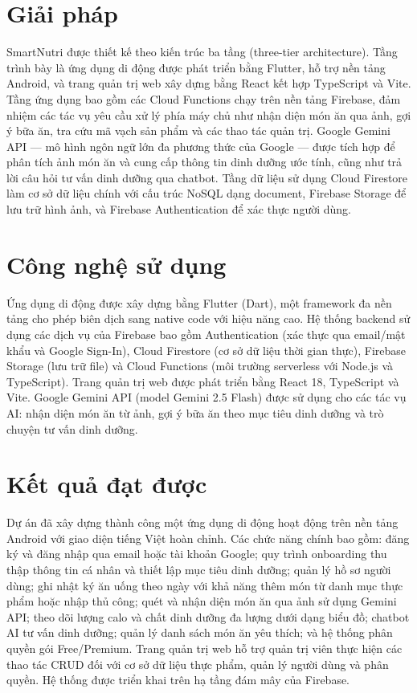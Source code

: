 \section*{Giải pháp}

SmartNutri được thiết kế theo kiến trúc ba tầng (three-tier architecture). Tầng trình bày là ứng dụng di động được phát triển bằng Flutter, hỗ trợ nền tảng Android, và trang quản trị web xây dựng bằng React kết hợp TypeScript và Vite. Tầng ứng dụng bao gồm các Cloud Functions chạy trên nền tảng Firebase, đảm nhiệm các tác vụ yêu cầu xử lý phía máy chủ như nhận diện món ăn qua ảnh, gợi ý bữa ăn, tra cứu mã vạch sản phẩm và các thao tác quản trị. Google Gemini API — mô hình ngôn ngữ lớn đa phương thức của Google — được tích hợp để phân tích ảnh món ăn và cung cấp thông tin dinh dưỡng ước tính, cũng như trả lời câu hỏi tư vấn dinh dưỡng qua chatbot. Tầng dữ liệu sử dụng Cloud Firestore làm cơ sở dữ liệu chính với cấu trúc NoSQL dạng document, Firebase Storage để lưu trữ hình ảnh, và Firebase Authentication để xác thực người dùng.

\section*{Công nghệ sử dụng}

Ứng dụng di động được xây dựng bằng Flutter (Dart), một framework đa nền tảng cho phép biên dịch sang native code với hiệu năng cao. Hệ thống backend sử dụng các dịch vụ của Firebase bao gồm Authentication (xác thực qua email/mật khẩu và Google Sign-In), Cloud Firestore (cơ sở dữ liệu thời gian thực), Firebase Storage (lưu trữ file) và Cloud Functions (môi trường serverless với Node.js và TypeScript). Trang quản trị web được phát triển bằng React 18, TypeScript và Vite. Google Gemini API (model Gemini 2.5 Flash) được sử dụng cho các tác vụ AI: nhận diện món ăn từ ảnh, gợi ý bữa ăn theo mục tiêu dinh dưỡng và trò chuyện tư vấn dinh dưỡng.

\section*{Kết quả đạt được}

Dự án đã xây dựng thành công một ứng dụng di động hoạt động trên nền tảng Android với giao diện tiếng Việt hoàn chỉnh. Các chức năng chính bao gồm: đăng ký và đăng nhập qua email hoặc tài khoản Google; quy trình onboarding thu thập thông tin cá nhân và thiết lập mục tiêu dinh dưỡng; quản lý hồ sơ người dùng; ghi nhật ký ăn uống theo ngày với khả năng thêm món từ danh mục thực phẩm hoặc nhập thủ công; quét và nhận diện món ăn qua ảnh sử dụng Gemini API; theo dõi lượng calo và chất dinh dưỡng đa lượng dưới dạng biểu đồ; chatbot AI tư vấn dinh dưỡng; quản lý danh sách món ăn yêu thích; và hệ thống phân quyền gói Free/Premium. Trang quản trị web hỗ trợ quản trị viên thực hiện các thao tác CRUD đối với cơ sở dữ liệu thực phẩm, quản lý người dùng và phân quyền. Hệ thống được triển khai trên hạ tầng đám mây của Firebase.

